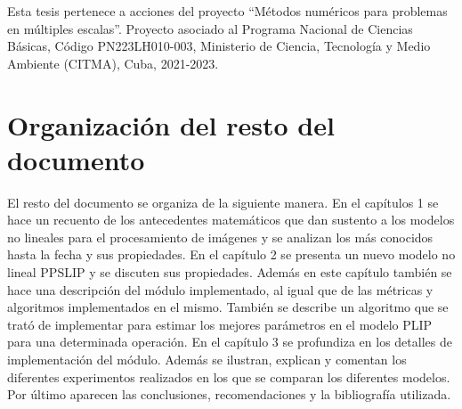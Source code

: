 Esta tesis pertenece a acciones del proyecto ``Métodos numéricos para problemas en múltiples escalas''. Proyecto asociado al Programa Nacional de Ciencias Básicas, Código PN223LH010-003, Ministerio de Ciencia, Tecnología y Medio Ambiente (CITMA), Cuba, 2021-2023.

\section*{Organizaci\'on del resto del documento}

El resto del documento se organiza de la siguiente manera. En el cap\'itulos 1 se hace un recuento de los antecedentes matem\'aticos que dan sustento a los modelos no lineales para el procesamiento de im\'agenes y se analizan los m\'as conocidos hasta la fecha y sus propiedades. En el cap\'itulo 2 se presenta un nuevo modelo no lineal PPSLIP y se discuten sus propiedades. Adem\'as en este cap\'itulo tambi\'en se hace una descripci\'on del m\'odulo implementado, al igual que de las m\'etricas y algoritmos implementados en el mismo. Tambi\'en se describe un algoritmo que se trat\'o de implementar para estimar los mejores par\'ametros en el modelo PLIP para una determinada operaci\'on. En el cap\'itulo 3 se profundiza en los detalles de implementaci\'on del m\'odulo. Adem\'as se ilustran, explican y comentan los diferentes experimentos realizados en los que se comparan los diferentes modelos. Por \'ultimo aparecen las conclusiones, recomendaciones y la bibliograf\'ia utilizada.